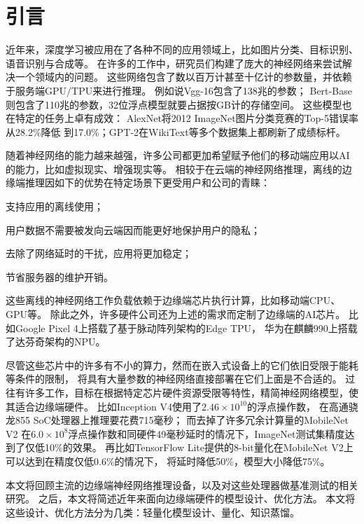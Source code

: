 \section{引言}
近年来，深度学习被应用在了各种不同的应用领域上，比如图片分类、目标识别、语音识别与合成等。
在许多的工作中，研究员们构建了庞大的神经网络来尝试解决一个领域内的问题。
这些网络包含了数以百万计甚至十亿计的参数量，并依赖于服务端GPU/TPU来进行推理。
例如说Vgg-16\cite{simonyan2014very}包含了138兆的参数；
Bert-Base\cite{devlin2018bert}则包含了110兆的参数，32位浮点模型就要占据按GB计的存储空间。
这些模型也在特定的任务上卓有成效：
AlexNet\cite{krizhevsky2012imagenet}将2012 ImageNet\cite{deng2009imagenet}图片分类竞赛的Top-5错误率从28.2\%降低
到17.0\%；GPT-2\cite{radford2019language}在WikiText等多个数据集上都刷新了成绩标杆。

随着神经网络的能力越来越强，许多公司都更加希望赋予他们的移动端应用以AI的能力，比如虚拟现实、增强现实等。
相较于在云端的神经网络推理，离线的边缘端推理因如下的优势在特定场景下更受用户和公司的青睐：
\begin{enumerate*}
    \item 支持应用的离线使用；
    \item 用户数据不需要被发向云端因而能更好地保护用户的隐私；
    \item 去除了网络延时的干扰，应用将更加稳定；
    \item 节省服务器的维护开销。
\end{enumerate*}
这些离线的神经网络工作负载依赖于边缘端芯片执行计算，比如移动端CPU、GPU等。
除此之外，许多硬件公司还为上述的需求而定制了边缘端的AI芯片。
比如Google Pixel 4上搭载了基于脉动阵列架构的Edge TPU\cite{edgetpu}，
华为在麒麟990上搭载了达芬奇架构的NPU。

尽管这些芯片中的许多有不小的算力，然而在嵌入式设备上的它们依旧受限于能耗等条件的限制，
将具有大量参数的神经网络直接部署在它们上面是不合适的。
过往有许多工作，目标在根据特定芯片硬件资源受限等特性，精简神经网络模型，使其适合边缘端硬件。
比如Inception V4\cite{szegedy2017inception}使用了$2.46\times 10^{10}$的浮点操作数，
在高通骁龙855 SoC处理器上推理要花费715毫秒；
而去掉了许多冗余计算量的MobileNet V2\cite{sandler2018mobilenetv2}
在$6.0\times 10^8$浮点操作数和同硬件49毫秒延时的情况下，ImageNet测试集精度达到了仅低10\%的效果。
再比如TensorFlow Lite提供的8-bit量化在MobileNet V2上可以达到在精度仅低0.6\%的情况下，
将延时降低50\%，模型大小降低75\%。

本文将回顾主流的边缘端神经网络推理设备，以及对这些处理器做基准测试的相关研究。
之后，本文将简述近年来面向边缘端硬件的模型设计、优化方法。
本文将这些设计、优化方法分为几类：轻量化模型设计、量化、知识蒸馏。
